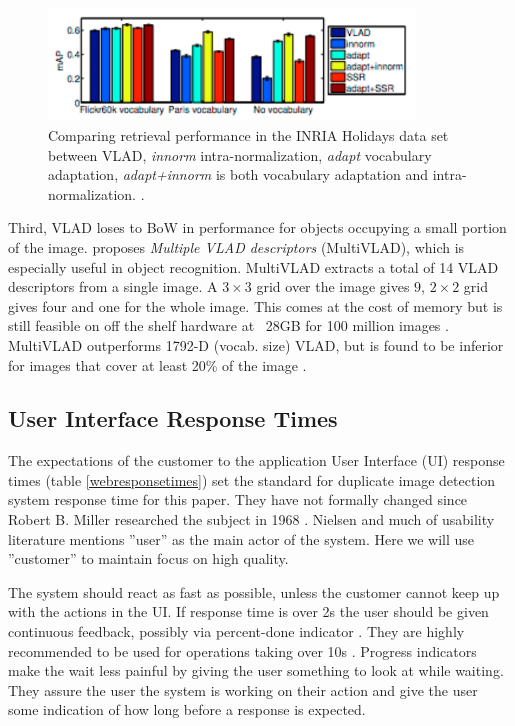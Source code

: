 \documentclass[english,12pt,a4paper,pdftex,elec,utf8]{aaltothesis}
\begin{document}
\begin{figure}[htb]
\begin{center}
\includegraphics[height=3cm]{figures/vladadapt}
\end{center}
\caption{Comparing retrieval performance in the INRIA Holidays data set between VLAD, \emph{innorm} intra-normalization, \emph{adapt} vocabulary adaptation, \emph{adapt+innorm} is both vocabulary adaptation and intra-normalization. \cite{Arandjelovic2013}.}
\label{vladadapt}
\end{figure}

Third, VLAD loses to BoW in performance for objects occupying a small portion of the image. \cite{Arandjelovic2013} proposes \emph{Multiple VLAD descriptors} (MultiVLAD), which is especially useful in object recognition. MultiVLAD extracts a total of 14 VLAD descriptors from a single image. A $3 \times 3$ grid over the image gives $9$, $2 \times 2$ grid gives four and one for the whole image. This comes at the cost of memory but is still feasible on off the shelf hardware at ~28GB for 100 million images \cite{Arandjelovic2013}. MultiVLAD outperforms 1792-D (vocab. size) VLAD, but is found to be inferior for images that cover at least 20\% of the image \cite{Arandjelovic2013}.

\subsection{User Interface Response Times}
The expectations of the customer to the application User Interface (UI) response times (table \ref{webresponsetimes}) set the standard for duplicate image detection system response time for this paper. They have not formally changed since Robert B. Miller researched the subject in 1968 \cite{Nielsen1993}. Nielsen and much of usability literature mentions ''user'' as the main actor of the system. Here we will use ''customer'' to maintain focus on high quality.

The system should react as fast as possible, unless the customer cannot keep up with the actions in the UI. If response time is over 2s the user should be given continuous feedback, possibly via percent-done indicator \cite{Myers1985}. They are highly recommended to be used for operations taking over 10s \cite{Nielsen1993}. Progress indicators make the wait less painful by giving the user something to look at while waiting. They assure the user the system is working on their action and give the user some indication of how long before a response is expected. \cite{Nielsen1993a}
\end{document}
